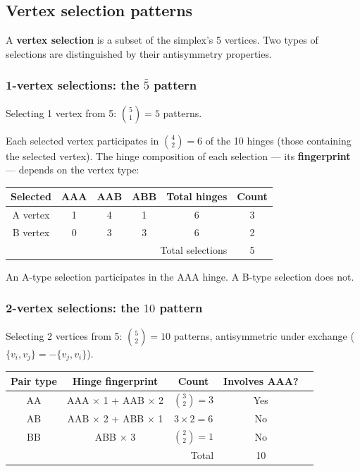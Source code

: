 \documentclass[12pt]{article}
\theoremstyle{remark}
\theoremstyle{definition}
\begin{document}
\subsection{Vertex selection patterns}
\label{sec:fermion_combinatorics}

A \textbf{vertex selection} is a subset of the simplex's 5 vertices. Two types of selections are distinguished by their antisymmetry properties.

\subsubsection{1-vertex selections: the $\bar{5}$ pattern}

Selecting 1 vertex from 5: $\binom{5}{1} = 5$ patterns.

Each selected vertex participates in $\binom{4}{2} = 6$ of the 10 hinges (those containing the selected vertex). The hinge composition of each selection --- its \textbf{fingerprint} --- depends on the vertex type:

\begin{center}
\begin{tabular}{cccccc}
\hline
Selected & AAA & AAB & ABB & Total hinges & Count \\
\hline
A vertex & 1 & 4 & 1 & 6 & 3 \\
B vertex & 0 & 3 & 3 & 6 & 2 \\
\hline
\multicolumn{5}{r}{Total selections} & 5 \\
\hline
\end{tabular}
\end{center}

An A-type selection participates in the AAA hinge. A B-type selection does not.

\subsubsection{2-vertex selections: the $10$ pattern}

Selecting 2 vertices from 5: $\binom{5}{2} = 10$ patterns, antisymmetric under exchange ($\{v_i, v_j\} = -\{v_j, v_i\}$).

\begin{center}
\begin{tabular}{ccccc}
\hline
Pair type & Hinge fingerprint & Count & Involves AAA? \\
\hline
AA & AAA $\times$ 1 + AAB $\times$ 2 & $\binom{3}{2} = 3$ & Yes \\
AB & AAB $\times$ 2 + ABB $\times$ 1 & $3 \times 2 = 6$ & No \\
BB & ABB $\times$ 3 & $\binom{2}{2} = 1$ & No \\
\hline
\multicolumn{3}{r}{Total} & 10 \\
\hline
\end{tabular}
\end{center}
\end{document}
